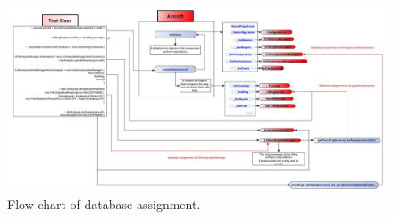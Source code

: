 \begin{figure}

\centering
\includegraphics[width=23cm]{immagini/HowToAssignDatabase.jpg}
\caption{Flow chart of database assignment.}
\label{fig:schemauno}

\end{figure}